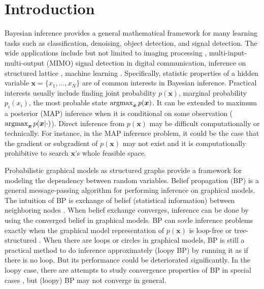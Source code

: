 \documentclass[conference]{IEEEtran}
\begin{document}
\section{Introduction}\label{sec:introduction}
Bayesian inference provides a general mathematical framework for many learning tasks such as classification, denoising, object detection, and signal detection. The wide applications include but not limited to imaging processing \cite{zhang2013denoise}, multi-input-multi-output (MIMO) signal detection in digital communication\cite{cespedes2014ep}, inference on structured lattice \cite{10.2307/25651244}, machine learning  \cite{2018arXiv180607066M, Lin:2015:DLM:2969239.2969280, yoon2019inferenceGraph}.
Specifically, statistic properties of a hidden variable $\bm{x} = \{x_1,\dots,x_N\}$ are of common interests in Bayesian inference. Practical interests usually include finding joint probability $p(\bm{x})$, marginal probability $p_i(x_i)$, the most probable state $\operatorname{argmax}_{\bm{x}} p(\bm{x})$. It can be extended to maximum a posterior (MAP) inference when it is conditional on some observation ($\operatorname{argmax}_{\bm{x}}p(\bm{x} | \cdot)$). Direct inference from $p(\bm{x})$ may be difficult computationally or technically. For instance, in the MAP inference problem, it could be the case that the gradient or subgradient of $p(\bm{x})$ may not exist and it is computationally prohibitive to search $\bm{x}$'s whole feasible space.


Probabilistic graphical models as structured graphs provide a framework for modeling the dependency between random variables. Belief propagation (BP) is a general message-passing algorithm for performing inference on graphical models. The intuition of BP is exchange of belief (statistical information) between neighboring nodes \cite{Bishop:2006:PRM:1162264}. When belief exchange converges, inference can be done by using the converged belief in graphical models. BP can sovle inference problems exactly when the graphical model representation of $p(\bm{x})$ is loop-free or tree-structured \cite{kschischang2001factor_graph}.
When there are loops or circles in graphical models, BP is still a practical method to do inference approximately (loopy BP) by running it as if there is no loop. But its performance could be deteriorated significantly. In the loopy case,
there are attempts to study convergence properties of BP in special cases \cite{Ihler:2005:LBP:1046920.1088703, du2017convergenceBP}, but (loopy) BP may not converge in general.
\end{document}
